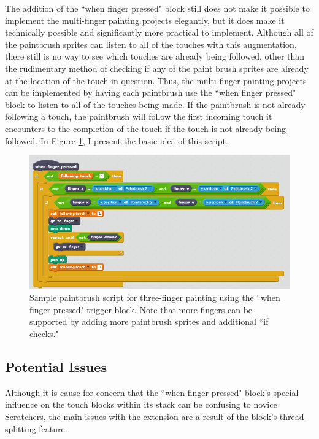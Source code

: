 The addition of the ``when finger pressed" block still does not make it possible to implement the multi-finger painting projects elegantly, but it does make it technically possible and significantly more practical to implement. Although all of the paintbrush sprites can listen to all of the touches with this augmentation, there still is no way to see which touches are already being followed, other than the rudimentary method of checking if any of the paint brush sprites are already at the location of the touch in question. Thus, the multi-finger painting projects can be implemented by having each paintbrush use the ``when finger pressed" block to listen to all of the touches being made. If the paintbrush is not already following a touch, the paintbrush will follow the first incoming touch it encounters to the completion of the touch if the touch is not already being followed. In Figure \ref{MultiFingerPaintingCFD}, I present the basic idea of this script.

\begin{figure}
\centering
\includegraphics[width=1.0\textwidth]{images/MultiFingerPaintingCFD.PNG}
\caption[Sample Script for Multi-Finger Painting Using the Closest Finger Design Extension]{Sample paintbrush script for three-finger painting using the ``when finger pressed" trigger block. Note that more fingers can be supported by adding more paintbrush sprites and additional ``if checks."}
\label{MultiFingerPaintingCFD}
\end{figure}

\subsection{Potential Issues}
Although it is cause for concern that the ``when finger pressed" block's special influence on the touch blocks within its stack can be confusing to novice Scratchers, the main issues with the extension are a result of the block's thread-splitting feature.

